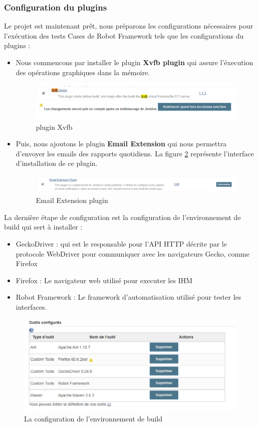 \subsubsection{Configuration du plugins}
Le projet est maintenant prêt, nous préparons les configurations nécessaires pour l'exécution des tests Cases de Robot Framework tels que les configurations du plugins :
\begin{itemize}
	\item Nous commencons par installer le plugin \textbf{Xvfb plugin} qui assure l'éxecution des opérations graphiques dans la mémoire.
	\begin{figure}[H]
		\centering
		\includegraphics[width=0.9\linewidth]{img/jenkins/xvfb}
		\caption[plugin Xvfb]{plugin Xvfb}
		\label{fig:xvfb}
	\end{figure}
	
	\item Puis, nous ajoutons le plugin \textbf{Email Extension} qui nous permettra d'envoyer les emails des rapports quotidiens. La figure \ref{fig:email} représente l'interface d'installation de ce plugin.
	\begin{figure}[H]
		\centering
		\includegraphics[width=0.9\linewidth]{img/jenkins/email}
		\caption[Email Extension plugin]{Email Extension plugin}
		\label{fig:email}
	\end{figure}
	
\end{itemize}
\newpage
La dernière étape de configuration est la configuration de l'environnement de build qui sert à installer :
\begin{itemize}
	\item GeckoDriver : qui est le responsable pour l'API HTTP décrite par le protocole WebDriver pour communiquer avec les navigateurs Gecko, comme Firefox
	\item Firefox : Le navigateur web utilisé pour executer les IHM
	\item Robot Framework : Le framework d'automatisation utilisé pour tester les interfaces.
\end{itemize}
\begin{figure}[H]
	\centering
	\includegraphics[width=0.7\linewidth]{img/jenkins/env-build}
	\caption[La configuration de l'environnement de build]{La configuration de l'environnement de build}
	\label{fig:env-build}
\end{figure}
